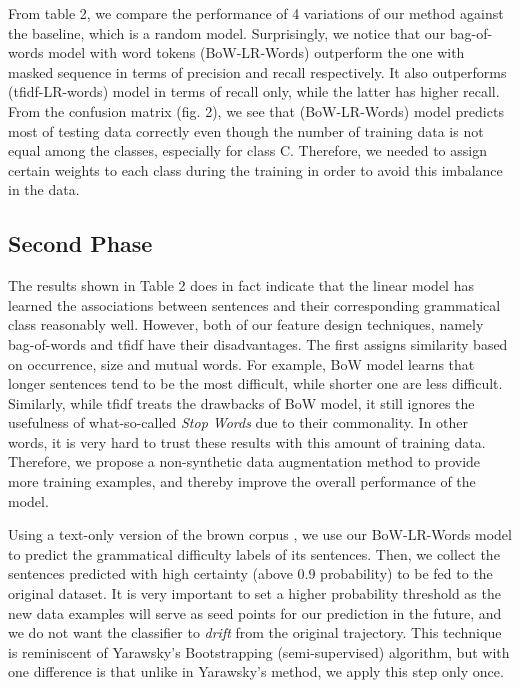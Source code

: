 From table 2, we compare the performance of 4 variations of our method against the baseline, which is a random model. Surprisingly, we notice that our bag-of-words model with word tokens (BoW-LR-Words) outperform the one with masked sequence in terms of precision and recall respectively. It also outperforms (tfidf-LR-words) model in terms of recall only, while the latter has higher recall. From the confusion matrix (fig. 2), we see that (BoW-LR-Words) model predicts most of testing data correctly even though the number of training data is not equal among the classes, especially for class C. Therefore, we needed to assign certain weights to each class during the training in order to avoid this imbalance in the data. 

\subsection{Second Phase}

The results shown in Table 2 does in fact indicate that the linear model has learned the associations between sentences and their corresponding grammatical class reasonably well. However, both of our feature design techniques, namely bag-of-words and tfidf have their disadvantages. The first assigns similarity based on occurrence, size and mutual words. For example, BoW model learns that longer sentences tend to be the most difficult, while shorter one are less difficult. Similarly, while tfidf treats the drawbacks of BoW model, it still ignores the usefulness of what-so-called \textit{Stop Words} due to their commonality. In other words, it is very hard to trust these results with this amount of training data. Therefore, we propose a non-synthetic data augmentation method to provide more training examples, and thereby improve the overall performance of the model. 

Using a text-only version of the brown corpus \citep{citeulike:13797746} , we use our BoW-LR-Words model to predict the grammatical difficulty labels of its sentences. Then, we collect the sentences predicted with high certainty (above 0.9 probability) to be fed to the original dataset. It is very important to set a higher probability threshold as the new data examples will serve as seed points for our prediction in the future, and we do not want the classifier to \textit{drift} from the original trajectory. This technique is reminiscent of Yarawsky's Bootstrapping \citep{yarowsky_unsupervised_1995}(semi-supervised) algorithm, but with one difference is that unlike in Yarawsky's method, we apply this step only once. 

